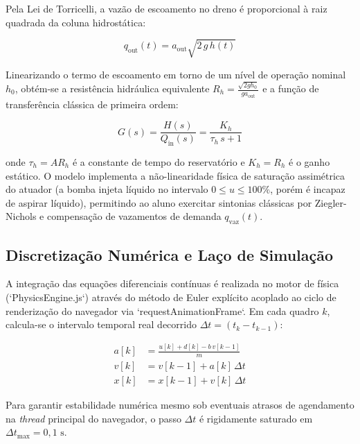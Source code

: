Pela Lei de Torricelli, a vazão de escoamento no dreno é proporcional à raiz quadrada da coluna hidrostática:

\begin{equation}
    q_{\text{out}}(t) = a_{\text{out}} \sqrt{2 \, g \, h(t)}
    \label{eq:torricelli}
\end{equation}

Linearizando o termo de escoamento em torno de um nível de operação nominal $h_0$, obtém-se a resistência hidráulica equivalente $R_h = \frac{\sqrt{2 g h_0}}{g a_{\text{out}}}$ e a função de transferência clássica de primeira ordem:

\begin{equation}
    G(s) = \frac{H(s)}{Q_{\text{in}}(s)} = \frac{K_h}{\tau_h \, s + 1}
    \label{eq:ft_tanque}
\end{equation}

\noindent onde $\tau_h = A R_h$ é a constante de tempo do reservatório e $K_h = R_h$ é o ganho estático. O modelo implementa a não-linearidade física de saturação assimétrica do atuador (a bomba injeta líquido no intervalo $0 \le u \le 100\%$, porém é incapaz de aspirar líquido), permitindo ao aluno exercitar sintonias clássicas por Ziegler-Nichols e compensação de vazamentos de demanda $q_{\text{vaz}}(t)$.

\subsection{Discretização Numérica e Laço de Simulação}
\label{subsec:laco_simulacao}

A integração das equações diferenciais contínuas é realizada no motor de física (`PhysicsEngine.js`) através do método de Euler explícito acoplado ao ciclo de renderização do navegador via `requestAnimationFrame`. Em cada quadro $k$, calcula-se o intervalo temporal real decorrido $\Delta t = (t_k - t_{k-1})$:

\begin{align}
    a[k] &= \frac{u[k] + d[k] - b \, v[k-1]}{m} \label{eq:aceleracao_discreta} \\
    v[k] &= v[k-1] + a[k] \, \Delta t \label{eq:velocidade_discreta} \\
    x[k] &= x[k-1] + v[k] \, \Delta t \label{eq:posicao_discreta}
\end{align}

Para garantir estabilidade numérica mesmo sob eventuais atrasos de agendamento na \textit{thread} principal do navegador, o passo $\Delta t$ é rigidamente saturado em $\Delta t_{\max} = 0{,}1\text{ s}$.

